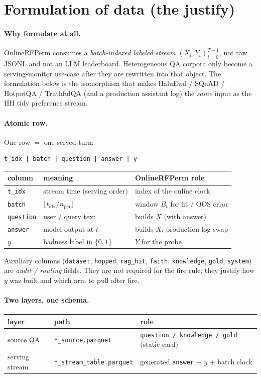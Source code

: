 \documentclass[11pt]{article}
\begin{document}
\section{Formulation of data (the justify)}
\label{sec:form}
\paragraph{Why formulate at all.}
OnlineRFPerm consumes a \emph{batch-indexed labeled stream}
$(X_t,Y_t)_{t=0}^{T-1}$, not raw JSONL and not an LLM leaderboard.
Heterogeneous QA corpora only become a serving-monitor use-case after they are
rewritten into that object. The formulation below is the isomorphism that makes
HaluEval / SQuAD / HotpotQA / TruthfulQA (and a production assistant log) the
\emph{same} input as the HH tidy preference stream.

\paragraph{Atomic row.}
One row $=$ one served turn:
\begin{verbatim}
t_idx | batch | question | answer | y
\end{verbatim}
\begin{center}\small
\begin{tabular}{lll}
\toprule
column & meaning & OnlineRFPerm role \\
\midrule
\texttt{t\_idx} & stream time (serving order) & index of the online clock \\
\texttt{batch} & $\lfloor t_{\mathrm{idx}}/n_{\mathrm{per}}\rfloor$
  & window $B_t$ for fit / OOS error \\
\texttt{question} & user / query text & builds $X$ (with answer) \\
\texttt{answer} & model output at $t$ & builds $X$; production log swap \\
$y$ & badness label in $\{0,1\}$ & $Y$ for the probe \\
\bottomrule
\end{tabular}
\end{center}

\noindent
Auxiliary columns (\texttt{dataset}, \texttt{hopped}, \texttt{rag\_hit},
\texttt{faith}, \texttt{knowledge}, \texttt{gold}, \texttt{system}) are
\emph{audit / routing} fields. They are not required for the fire rule; they
justify how $y$ was built and which arm to pull after fire.

\paragraph{Two layers, one schema.}
\begin{center}\small
\begin{tabular}{lll}
\toprule
layer & path & role \\
\midrule
source QA & \texttt{*\_source.parquet}
  & \texttt{question / knowledge / gold} (static card) \\
serving stream & \texttt{*\_stream\_table.parquet}
  & generated \texttt{answer} + $y$ + batch clock \\
\bottomrule
\end{tabular}
\end{center}
\end{document}
